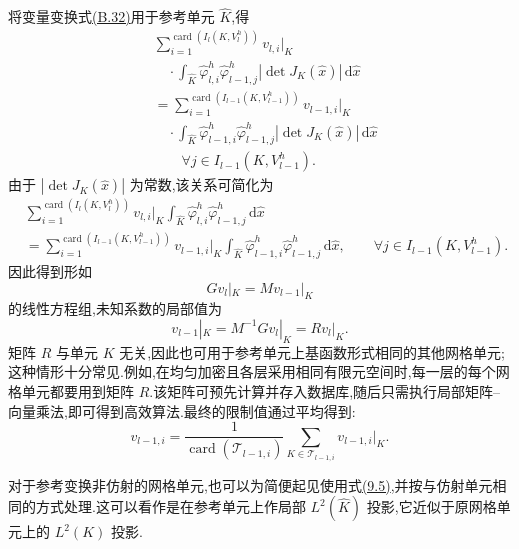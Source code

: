 \begin{note}[函数限制]
将变量变换式\hyperref[eq:appendix-b-32]{(B.32)}用于参考单元 $\widehat K$,得
\[
\begin{aligned}
 &\sum_{i=1}^{\operatorname{card}(I_l(K,V_l^h))}v_{l,i}|_K\\
 &\quad\cdot\int_{\widehat K}
   \widehat\varphi_{l,i}^h\widehat\varphi_{l-1,j}^h
   |\det J_K(\widehat x)|\,\mathrm d\widehat x\\
 &=\sum_{i=1}^{\operatorname{card}(I_{l-1}(K,V_{l-1}^h))}v_{l-1,i}|_K\\
 &\quad\cdot\int_{\widehat K}
   \widehat\varphi_{l-1,i}^h\widehat\varphi_{l-1,j}^h
   |\det J_K(\widehat x)|\,\mathrm d\widehat x\\
 &\qquad \forall j\in I_{l-1}(K,V_{l-1}^h).
\end{aligned}
\]
由于 $|\det J_K(\widehat x)|$ 为常数,该关系可简化为
\begin{equation}\label{eq:chapter9-local-projection-reference}
\begin{aligned}
 &\sum_{i=1}^{\operatorname{card}(I_l(K,V_l^h))}
   v_{l,i}|_K\int_{\widehat K}
   \widehat\varphi_{l,i}^h\widehat\varphi_{l-1,j}^h\,\mathrm d\widehat x\\
 &=\sum_{i=1}^{\operatorname{card}(I_{l-1}(K,V_{l-1}^h))}
   v_{l-1,i}|_K\int_{\widehat K}
   \widehat\varphi_{l-1,i}^h\widehat\varphi_{l-1,j}^h\,\mathrm d\widehat x,
 \qquad \forall j\in I_{l-1}(K,V_{l-1}^h).
\end{aligned}
\end{equation}
因此得到形如
\[
 Gv_l|_K=Mv_{l-1}|_K
\]
的线性方程组,未知系数的局部值为
\begin{equation}\label{eq:chapter9-local-restriction-matrix}
 v_{l-1}|_K=M^{-1}Gv_l|_K=Rv_l|_K.
\end{equation}
矩阵 $R$ 与单元 $K$ 无关,因此也可用于参考单元上基函数形式相同的其他网格单元;这种情形十分常见.例如,在均匀加密且各层采用相同有限元空间时,每一层的每个网格单元都要用到矩阵 $R$.该矩阵可预先计算并存入数据库,随后只需执行局部矩阵--向量乘法,即可得到高效算法.最终的限制值通过平均得到:
\[
 v_{l-1,i}=\frac{1}{\operatorname{card}(\mathcal T_{l-1,i})}
   \sum_{K\in\mathcal T_{l-1,i}}v_{l-1,i}|_K.
\]

对于参考变换非仿射的网格单元,也可以为简便起见使用式\hyperref[eq:chapter9-local-projection-reference]{(9.5)},并按与仿射单元相同的方式处理.这可以看作是在参考单元上作局部 $L^2(\widehat K)$ 投影,它近似于原网格单元上的 $L^2(K)$ 投影.
\end{note}


